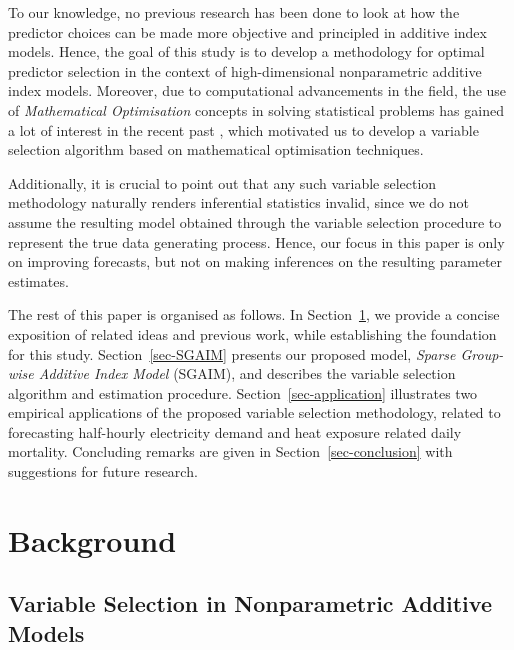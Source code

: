 \documentclass[11pt,a4paper,]{article}
\begin{document}
To our knowledge, no previous research has been done to look at how the
predictor choices can be made more objective and principled in additive
index models. Hence, the goal of this study is to develop a methodology
for optimal predictor selection in the context of high-dimensional
nonparametric additive index models. Moreover, due to computational
advancements in the field, the use of \emph{Mathematical Optimisation}
concepts in solving statistical problems has gained a lot of interest in
the recent past \autocite{Theusl2020}, which motivated us to develop a
variable selection algorithm based on mathematical optimisation
techniques.

Additionally, it is crucial to point out that any such variable
selection methodology naturally renders inferential statistics invalid,
since we do not assume the resulting model obtained through the variable
selection procedure to represent the true data generating process.
Hence, our focus in this paper is only on improving forecasts, but not
on making inferences on the resulting parameter estimates.

The rest of this paper is organised as follows. In
Section~\ref{sec-background}, we provide a concise exposition of related
ideas and previous work, while establishing the foundation for this
study. Section~\ref{sec-SGAIM} presents our proposed model, \emph{Sparse
Group-wise Additive Index Model} (SGAIM), and describes the variable
selection algorithm and estimation procedure.
Section~\ref{sec-application} illustrates two empirical applications of
the proposed variable selection methodology, related to forecasting
half-hourly electricity demand and heat exposure related daily
mortality. Concluding remarks are given in Section~\ref{sec-conclusion}
with suggestions for future research.

\hypertarget{sec-background}{%
\section{Background}\label{sec-background}}

\hypertarget{variable-selection-in-nonparametric-additive-models}{%
\subsection{Variable Selection in Nonparametric Additive
Models}\label{variable-selection-in-nonparametric-additive-models}}
\end{document}
